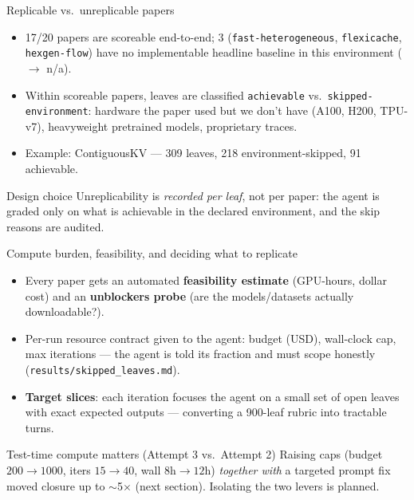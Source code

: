 \documentclass[aspectratio=169]{beamer}
\begin{document}
\begin{frame}{Replicable vs.\ unreplicable papers}
  \begin{itemize}
    \item 17/20 papers are scoreable end-to-end; 3 (\texttt{fast-heterogeneous},
          \texttt{flexicache}, \texttt{hexgen-flow}) have no implementable headline
          baseline in this environment ($\rightarrow$ n/a).
    \item Within scoreable papers, leaves are classified \texttt{achievable} vs.\
          \texttt{skipped-environment}:
          hardware the paper used but we don't have (A100, H200, TPU-v7),
          heavyweight pretrained models, proprietary traces.
    \item Example: ContiguousKV --- 309 leaves, 218 environment-skipped, 91 achievable.
  \end{itemize}
  \vfill
  \begin{block}{Design choice}
    Unreplicability is \emph{recorded per leaf}, not per paper: the agent is graded
    only on what is achievable in the declared environment, and the skip reasons are audited.
  \end{block}
\end{frame}

\begin{frame}{Compute burden, feasibility, and deciding what to replicate}
  \begin{itemize}
    \item Every paper gets an automated \textbf{feasibility estimate} (GPU-hours, dollar cost)
          and an \textbf{unblockers probe} (are the models/datasets actually downloadable?).
    \item Per-run resource contract given to the agent: budget (USD), wall-clock cap,
          max iterations --- the agent is told its fraction and must scope honestly
          (\texttt{results/skipped\_leaves.md}).
    \item \textbf{Target slices}: each iteration focuses the agent on a small set of
          open leaves with exact expected outputs --- converting a 900-leaf rubric into
          tractable turns.
  \end{itemize}
  \vfill
  \begin{block}{Test-time compute matters (Attempt 3 vs.\ Attempt 2)}
    Raising caps (budget $200\!\rightarrow\!1000$, iters $15\!\rightarrow\!40$,
    wall $8\text{h}\!\rightarrow\!12\text{h}$) \emph{together with} a targeted prompt fix
    moved closure up to $\sim$5$\times$ (next section). Isolating the two levers is planned.
  \end{block}
\end{frame}
\end{document}
